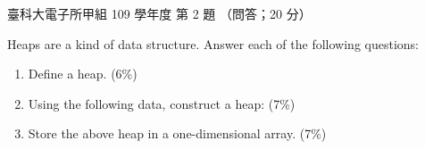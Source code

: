 \begin{pastexam}[label={px:ntust-109-et-ds-02}]{臺科大電子所甲組 109 學年度 第 2 題}
（問答；20 分）

Heaps are a kind of data structure. Answer each of the following questions:
\begin{enumerate}[label=(\alph*)]
\item Define a heap. (6\%)
\item Using the following data, construct a heap: (7\%)

\item Store the above heap in a one-dimensional array. (7\%)
\end{enumerate}
\end{pastexam}

